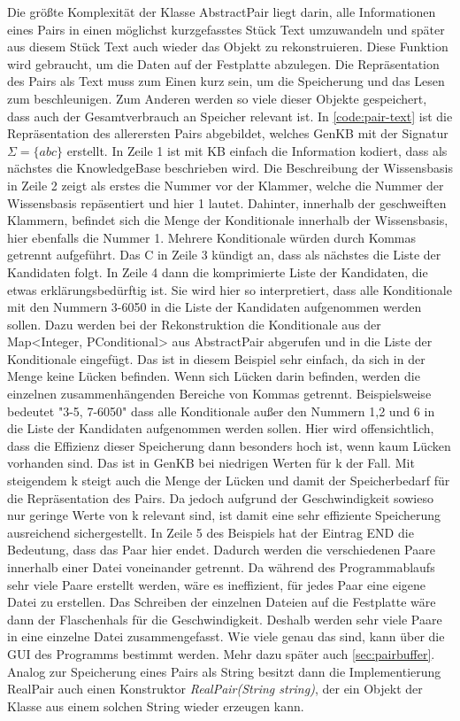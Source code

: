 \documentclass[12pt,a4paper]{article}
\begin{document}
Die größte Komplexität der Klasse AbstractPair liegt darin, alle Informationen eines Pairs in einen möglichst kurzgefasstes Stück Text umzuwandeln und später aus diesem Stück Text auch wieder das Objekt zu rekonstruieren. Diese Funktion wird gebraucht, um die Daten auf der Festplatte abzulegen. Die Repräsentation des Pairs als Text muss zum Einen kurz sein, um die Speicherung und das Lesen zum beschleunigen. Zum Anderen werden so viele dieser Objekte gespeichert, dass auch der Gesamtverbrauch an Speicher relevant ist. In \autoref{code:pair-text} ist die Repräsentation des allerersten Pairs abgebildet, welches GenKB mit der Signatur $\Sigma=\{abc\}$  erstellt. In Zeile 1 ist mit KB einfach die Information kodiert, dass als nächstes die KnowledgeBase beschrieben wird. Die Beschreibung der Wissensbasis in Zeile 2 zeigt als erstes die Nummer vor der Klammer, welche die Nummer der Wissensbasis repäsentiert und hier 1 lautet. Dahinter, innerhalb der geschweiften Klammern, befindet sich die Menge der Konditionale innerhalb der Wissensbasis, hier ebenfalls die Nummer 1. Mehrere Konditionale würden durch Kommas getrennt aufgeführt. Das C in Zeile 3 kündigt an, dass als nächstes die Liste der Kandidaten folgt. In Zeile 4 dann die komprimierte Liste der Kandidaten, die etwas erklärungsbedürftig ist. Sie wird hier so interpretiert, dass alle Konditionale mit den Nummern 3-6050 in die Liste der Kandidaten aufgenommen werden sollen. Dazu werden bei der Rekonstruktion die Konditionale aus der Map<Integer, PConditional> aus AbstractPair abgerufen und in die Liste der Konditionale eingefügt. Das ist in diesem Beispiel sehr einfach, da sich in der Menge keine Lücken befinden. Wenn sich Lücken darin befinden, werden die einzelnen zusammenhängenden Bereiche von Kommas getrennt. Beispielsweise bedeutet "3-5, 7-6050" \space dass alle Konditionale außer den Nummern 1,2 und 6 in die Liste der Kandidaten aufgenommen werden sollen. Hier wird offensichtlich, dass die Effizienz dieser Speicherung dann besonders hoch ist, wenn kaum Lücken vorhanden sind. Das ist in GenKB bei niedrigen Werten für k der Fall. Mit steigendem k steigt auch die Menge der Lücken und damit der Speicherbedarf für die Repräsentation des Pairs. Da jedoch aufgrund der Geschwindigkeit sowieso nur geringe Werte von k relevant sind, ist damit eine sehr effiziente Speicherung ausreichend sichergestellt. In Zeile 5 des Beispiels hat der Eintrag END die Bedeutung, dass das Paar hier endet. Dadurch werden die verschiedenen Paare innerhalb einer Datei voneinander getrennt. Da während des Programmablaufs sehr viele Paare erstellt werden, wäre es ineffizient, für jedes Paar eine eigene Datei zu erstellen. Das Schreiben der einzelnen Dateien auf die Festplatte wäre dann der Flaschenhals für die Geschwindigkeit. Deshalb werden sehr viele Paare in eine einzelne Datei zusammengefasst. Wie viele genau das sind, kann über die GUI des Programms bestimmt werden. Mehr dazu später auch \autoref{sec:pairbuffer}. Analog zur Speicherung eines Pairs als String besitzt dann die Implementierung RealPair auch einen Konstruktor \textit{RealPair(String string)}, der ein Objekt der Klasse aus einem solchen String wieder erzeugen kann.
\end{document}
